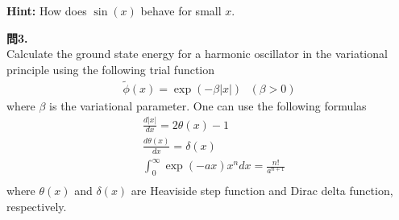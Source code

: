 \documentclass{jlreq}
\begin{document}
\noindent
\textbf{Hint:} How does $\sin(x)$ behave for small $x$.

\clearpage

\noindent
\textbf{問3.}\\

\noindent
Calculate the ground state energy for a harmonic oscillator in the variational principle using the following trial function
\begin{eqnarray}
    \tilde{\phi}(x)=\exp(-\beta|x|) \ \ \ (\beta>0)
\end{eqnarray}  
where $\beta$ is the variational parameter. One can use the following formulas
\begin{eqnarray}
    &\frac{d|x|}{dx}=2\theta(x)-1 \\
    &\frac{d\theta(x)}{dx}=\delta(x) \\
    &\int_0^\infty \exp(-ax)x^n dx=\frac{n!}{a^{n+1}} \\
\end{eqnarray}  
where $\theta(x)$ and $\delta(x)$ are Heaviside step function and Dirac delta function, respectively.\\

\end{document}
